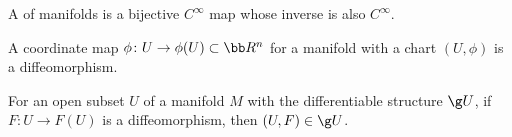 A  of manifolds is a bijective $C^\infty$ map whose inverse is also $C^\infty$.

A coordinate map $\phi \colon U \to \phi(U) \subset \bb R^n$ for a manifold with a chart $(U, \phi)$ is a diffeomorphism.

For an open subset $U$ of a manifold $M$ with the differentiable structure $\g U$, if $F \colon U \to F(U)$ is a diffeomorphism, then $(U, F) \in \g U$.
